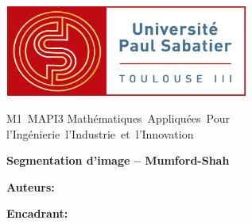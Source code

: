 \begin{titlepage}
\noindent
\begin{minipage}{0.55\linewidth}
\includegraphics[height=3cm, width=8cm]{images/ut3_logo.jpg}
\end{minipage}
\hfill
\begin{minipage}{0.5\linewidth}
\begin{flushright}
\begin{center}\large
M1~MAPI3
Mathématiques~Appliquées~Pour
l'Ingénierie~l'Industrie~et~l'Innovation
\end{center}
\end{flushright}
\end{minipage}


\noindent\hrulefill

\begin{center}\bfseries\huge
Segmentation d'image -- Mumford-Shah
\end{center}

\noindent\hrulefill

\vspace*{3cm}

\noindent
\begin{minipage}{0.45\linewidth}
\begin{center}\Large
\textbf{Auteurs:}
\end{center}
\end{minipage}
\hfill
\begin{minipage}{0.45\linewidth}
\begin{center}\Large
\textbf{Encadrant:}
\end{center}
\end{minipage}

\vspace*{0.8cm}


\end{titlepage}
